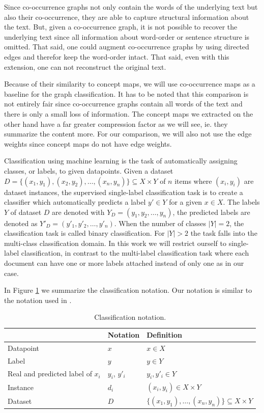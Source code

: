 Since co-occurrence graphs not only contain the words of the underlying text but also their co-occurrence, they are able to capture structural information about the text.
But, given a co-occurrence graph, it is not possible to recover the underlying text since all information about word-order or sentence structure is omitted.
That said, one could augment co-occurrence graphs by using directed edges and therefor keep the word-order intact.
That said, even with this extension, one can not reconstruct the original text.

Because of their similarity to concept maps, we will use co-occurrence maps as a baseline for the graph classification.
It has to be noted that this comparison is not entirely fair since co-occurrence graphs contain all words of the text and there is only a small loss of information.
The concept maps we extracted on the other hand have a far greater compression factor as we will see, ie. they summarize the content more.
For our comparison, we will also not use the edge weights since concept maps do not have edge weights.


Classification using machine learning is the task of automatically assigning classes, or labels, to given datapoints.
Given a dataset $D = \{(x_1, y_1), (x_2, y_2), \ldots, (x_n, y_n) \} \subseteq X \times Y$ of $n$ items where $(x_i, y_i)$ are dataset instances, the supervised single-label classification task is to create a classifier which automatically predicts a label $y' \in Y$ for a given $x \in X$.
The labels $Y$ of dataset $D$ are denoted with $Y_D = (y_1, y_2, \ldots, y_n )$, the predicted labels are denoted as $Y'_D = (y'_1, y'_2, \ldots, y'_n )$.
When the number of classes $|Y| = 2$, the classification task is called binary classification. For $|Y| > 2$ the task falls into the multi-class classification domain.
In this work we will restrict ourself to single-label classification, in contrast to the multi-label classification task where each document can have one or more labels attached instead of only one as in our case.

In Figure \ref{table:classification_notation} we summarize the classification notation.
Our notation is similar to the notation used in \cite[p.~11]{Bishop2006}.

\begin{table}[htb!]
	\centering
	\begin{tabular}{lll}
\toprule
		& Notation & Definition \\
		\toprule
		Datapoint & $x$ & $x \in X$
		\\
		Label & $y$ & $y \in Y$
		\\
		Real and predicted label of $x_i$ & $y_i$, $y'_i$ &  $y_i, y'_i \in Y$
		\\
		Instance & $d_i$ & $(x_i, y_i) \in X \times Y$
		\\
		Dataset & $D$ & $\{(x_1, y_1), \ldots, (x_n, y_n) \} \subseteq X \times Y$ 
	\end{tabular}
	\caption[Notation: Classification]{Classification notation.}\label{table:classification_notation}
\end{table}

